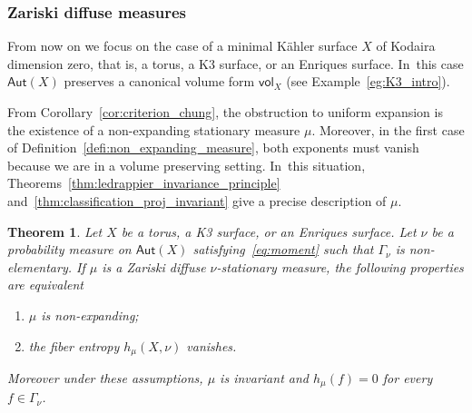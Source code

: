 \documentclass[JEP,XML,SOM,Unicode,published]{cedram}
\newenvironment{enumeratea}
{\bgroup\def\theenumi{\alph{enumi}}\begin{enumerate}}
{\end{enumerate}\egroup}
\newcommand\Aut{\mathsf{Aut}}
\newcommand{\vol}{{\mathsf{vol}}}
\theoremstyle{plain}
\newtheorem{thm}{Theorem}[section]
\theoremstyle{definition}
\begin{document}
\subsubsection{Zariski diffuse measures}
From now on we focus on the case of a minimal Kähler surface
$X$ of Kodaira dimension zero, that is,
a torus, a K3 surface, or an Enriques surface. In~this case
$\Aut(X)$ preserves a canonical volume form $\vol_X$ (see Example~\ref{eg:K3_intro}).\enlargethispage{\baselineskip}%

From Corollary~\ref{cor:criterion_chung}, the obstruction
to uniform expansion is the existence of a non-expanding stationary measure $\mu$. Moreover, in the first case of Definition~\ref{defi:non_expanding_measure}, both
exponents must vanish because we are in a volume preserving setting. In~this situation,
Theorems~\ref{thm:ledrappier_invariance_principle}
and~\ref{thm:classification_proj_invariant} give a precise description of $\mu$.

\begin{thm}\label{thm:rigidity}
Let $X$ be a torus, a K3 surface, or an Enriques surface. Let $\nu$ be a probability measure on
$\Aut(X)$ satisfying~\eqref{eq:moment} such that $\Gamma_\nu$ is non-elementary.
If $\mu$ is a Zariski diffuse $\nu$-stationary measure, the following properties are equivalent
\begin{enumeratea}
\item\label{thm:rigiditya}
$\mu$ is non-expanding;
\item\label{thm:rigidityb}
the fiber entropy $h_\mu(X, \nu)$ vanishes.
\end{enumeratea}
Moreover under these assumptions, $\mu$ is invariant and $h_\mu(f)=0$ for every $f\in \Gamma_\nu$.
\end{thm}
\end{document}
